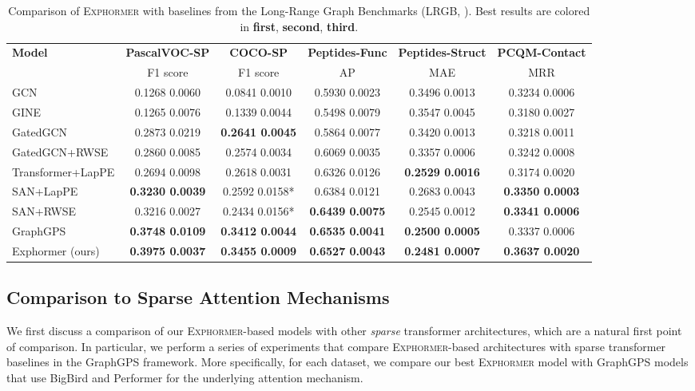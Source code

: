 \documentclass{article}
\theoremstyle{plain}
\theoremstyle{definition}
\theoremstyle{remark}
\newcommand{\first}[1]{\textbf{\textcolor{dark2green}{#1}}}
\newcommand{\second}[1]{\textbf{\textcolor{dark2orange}{#1}}}
\newcommand{\third}[1]{\textbf{\textcolor{dark2purple}{#1}}}
\begin{document}
\begin{table*}[t]
    \caption{Comparison of \textsc{Exphormer} with baselines from the Long-Range Graph Benchmarks (LRGB, \citealp{lrgb-2022}). Best results are colored in \first{first}, \second{second}, \third{third}.}
    \label{tab:lrgb}
    \fontsize{8.5pt}{8.5pt}\selectfont
    \setlength\tabcolsep{4pt} \centering
    \begin{tabular}{lccccc}\toprule
    \multirow{2}{*}{\textbf{Model}} &\textbf{PascalVOC-SP} &\textbf{COCO-SP} &\textbf{Peptides-Func} &\textbf{Peptides-Struct} &\textbf{PCQM-Contact} \\
    &F1 score  &F1 score  &AP  &MAE  &MRR  \\\midrule
    GCN &0.1268  0.0060 &0.0841  0.0010 &0.5930  0.0023 &0.3496  0.0013 &0.3234  0.0006 \\
    GINE &0.1265  0.0076 &0.1339  0.0044 &0.5498  0.0079 &0.3547  0.0045 &0.3180  0.0027 \\
    GatedGCN &0.2873  0.0219 &\third{0.2641  0.0045} &0.5864  0.0077 &0.3420  0.0013 &0.3218  0.0011 \\
    GatedGCN+RWSE &0.2860  0.0085 &0.2574  0.0034 &0.6069  0.0035 &0.3357  0.0006 &0.3242  0.0008 \\ \midrule
    Transformer+LapPE &0.2694  0.0098 & 0.2618  0.0031 &0.6326  0.0126 &\third{0.2529  0.0016} &0.3174  0.0020 \\
    SAN+LapPE &\third{0.3230  0.0039} &\phantom{*}0.2592  0.0158* &0.6384  0.0121 &0.2683  0.0043 &\second{0.3350  0.0003} \\
    SAN+RWSE & 0.3216  0.0027 &\phantom{*}0.2434  0.0156* &\third{0.6439  0.0075} &0.2545  0.0012 &\third{0.3341  0.0006} \\ 
    GraphGPS &\second{0.3748  0.0109} &\second{0.3412  0.0044} &\first{0.6535  0.0041} &\second{0.2500  0.0005} &0.3337  0.0006 \\ \midrule
    Exphormer (ours) & \first{0.3975  0.0037} & \first{0.3455  0.0009} & 	\second{0.6527  0.0043} & \first{0.2481  0.0007} & \first{	0.3637  0.0020} \\
    \bottomrule
    \end{tabular}
\end{table*}

\subsection{Comparison to Sparse Attention Mechanisms}\label{sec:attentioncomp}
We first discuss a comparison of our \textsc{Exphormer}-based models with other \emph{sparse} transformer architectures, which are a natural first point of comparison. In particular, we perform a series of experiments that compare \textsc{Exphormer}-based architectures with sparse transformer baselines in the GraphGPS framework. More specifically, for each dataset, we compare our best \textsc{Exphormer} model with GraphGPS models that use BigBird and Performer for the underlying attention mechanism.
\end{document}
